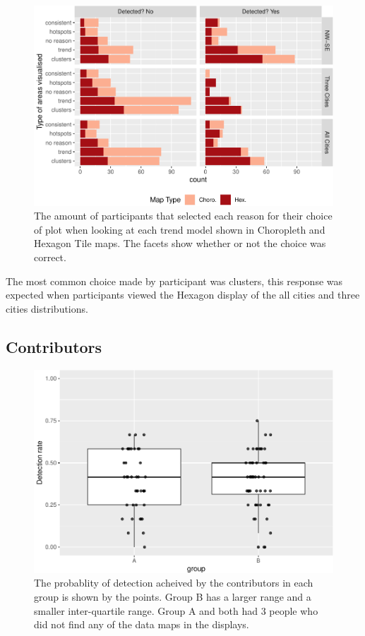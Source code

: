 \documentclass[conference,final,]{IEEEtran}
\makeatletter
\def\maxwidth{\ifdim\Gin@nat@width>\linewidth\linewidth
\else\Gin@nat@width\fi}
\let\Oldincludegraphics\includegraphics
\renewcommand{\includegraphics}[1]{\Oldincludegraphics[width=\maxwidth]{#1}}
\makeatother
\begin{document}
\begin{figure}
\centering
\includegraphics{paper_files/figure-latex/reason-1.pdf}
\caption{The amount of participants that selected each reason for their
choice of plot when looking at each trend model shown in Choropleth and
Hexagon Tile maps. The facets show whether or not the choice was
correct.}
\end{figure}

The most common choice made by participant was clusters, this response
was expected when participants viewed the Hexagon display of the all
cities and three cities distributions.

\hypertarget{contributors}{%
\subsection{Contributors}\label{contributors}}

\begin{figure}
\centering
\includegraphics{paper_files/figure-latex/contributors-1.pdf}
\caption{The probablity of detection acheived by the contributors in
each group is shown by the points. Group B has a larger range and a
smaller inter-quartile range. Group A and both had 3 people who did not
find any of the data maps in the displays.}
\end{figure}
\end{document}
